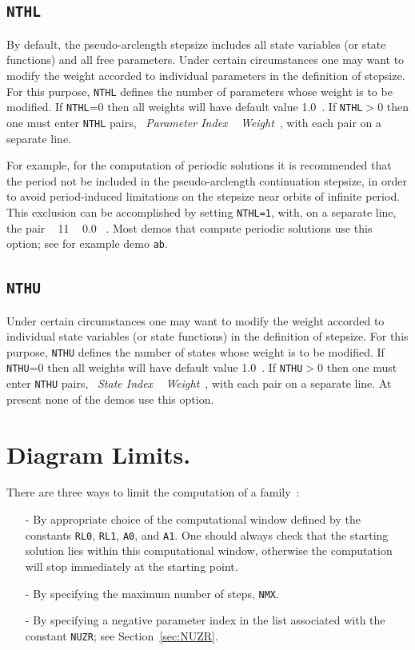\documentclass[12pt]{report}
\begin{document}
\subsection{\tt NTHL}  \label{sec:NTHL}
By default, the pseudo-arclength stepsize includes all state variables
(or state functions) and all free parameters.
Under certain circumstances one may want to modify the weight accorded 
to individual parameters in the definition of stepsize.
For this purpose, {\tt NTHL} defines the number of parameters whose weight 
is to be modified.
If {\tt NTHL}=0 then all weights will have default value 1.0~.
If {\tt NTHL}$>$0 then one must enter {\tt NTHL} pairs,
             ~{\it Parameter Index} ~ {\it Weight}~,
with each pair on a separate line.

For example, for the computation of periodic solutions it is 
recommended that the period not be included in the pseudo-arclength 
continuation stepsize, in order to avoid period-induced limitations 
on the stepsize near orbits of infinite period. 
This exclusion can be accomplished by setting {\tt NTHL=1}, with, 
on a separate line, the pair ~ 11 ~ 0.0 ~.
Most demos that compute periodic solutions use this option;
see for example demo {\tt ab}.

\subsection{\tt NTHU}  \label{sec:NTHU}
Under certain circumstances one may want to modify the weight accorded 
to individual state variables (or state functions) in the definition 
of stepsize.
For this purpose, {\tt NTHU} defines the number of states whose weight 
is to be modified.
If {\tt NTHU}=0 then all weights will have default value 1.0~.
If {\tt NTHU}$>$0 then one must enter {\tt NTHU} pairs,
             ~{\it State Index} ~ {\it Weight}~,
with each pair on a separate line.
At present none of the demos use this option.
\section{ Diagram Limits.} \label{sec:Diagram_limits}

There are three ways to limit the computation of a family~:

\begin{itemize}
\item[-]
By appropriate choice of the computational window 
defined by the constants {\tt RL0}, {\tt RL1}, {\tt A0}, and {\tt A1}.
One should always check that the starting solution lies within
this computational window, otherwise the computation will stop immediately
at the starting point.

\item[-]
By specifying the maximum number of steps, {\tt NMX}.

\item[-]
By specifying a negative parameter index in the list associated 
with the constant {\tt NUZR}; see Section~\ref{sec:NUZR}. 
\end{itemize}
\end{document}
